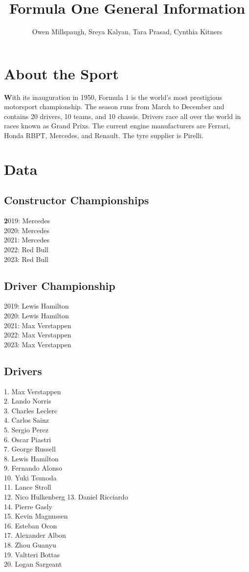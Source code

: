 \documentclass[12pt]{article}
\title{Formula One General Information}
\author{Owen Millspaugh, Sreya Kalyan, Tara Prasad, Cynthia Kitners}
\begin{document}
\maketitle

\section{About the Sport}
\textbf With its inauguration in 1950, Formula 1 is the world's most prestigious motorsport championship. 
The season runs from March to December and contains 20 drivers, 10 teams, and 10 chassis.
Drivers race all over the world in races known as Grand Prixs.
The current engine manufacturers are Ferrari, Honda RBPT, Mercedes, and Renault. 
The tyre supplier is Pirelli.
\section{Data}
\subsection{Constructor Championships}
\textbf 2019: Mercedes\\
2020: Mercedes\\
2021: Mercedes\\
2022: Red Bull\\
2023: Red Bull
\subsection{Driver Championship}
2019: Lewis Hamilton\\
2020: Lewis Hamilton\\
2021: Max Verstappen\\
2022: Max Verstappen\\
2023: Max Verstappen
\subsection{Drivers}
1. Max Verstappen\\
2. Lando Norris\\
3. Charles Leclerc\\
4. Carlos Sainz\\
5. Sergio Perez\\
6. Oscar Piastri\\
7. George Russell\\
8. Lewis Hamilton\\
9. Fernando Alonso\\
10. Yuki Tsunoda\\
11. Lance Stroll\\
12. Nico Hulkenberg
13. Daniel Ricciardo\\
14. Pierre Gasly\\
15. Kevin Magnussen\\
16. Esteban Ocon\\
17. Alexander Albon\\
18. Zhou Guanyu\\
19. Valtteri Bottas\\
20. Logan Sargeant
\end{document}
